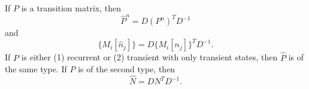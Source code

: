 If $P$ is a transition matrix, then
$$\hat{P}^n = D(P^n)^T D^{-1}$$
and
$$\{M_i[\hat{n}_j]\} = D\{M_i[n_j]\}^T D^{-1}.$$
If $P$ is either (1) recurrent or (2) transient with only transient states, then $\hat{P}$ is of the same type. If $P$ is of the second type, then
$$\hat{N} = DN^T D^{-1}.$$
